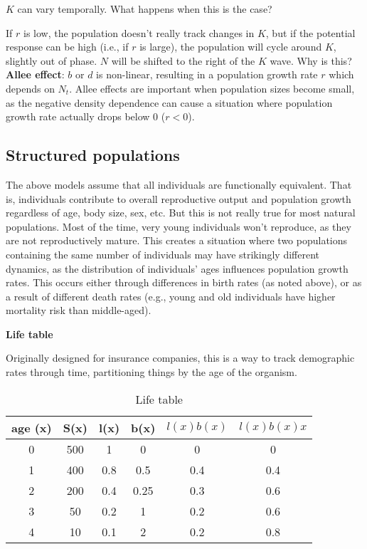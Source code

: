 \documentclass[12pt]{article}
\begin{document}
\bigskip

$K$ can vary temporally. What happens when this is the case? 

If $r$ is low, the population doesn't really track changes in $K$, but if the potential response can be high (i.e., if $r$ is large), the population will cycle around $K$, slightly out of phase. $N$ will be shifted to the right of the $K$ wave. Why is this? \\





\textbf{Allee effect}: $b$ or $d$ is non-linear, resulting in a population growth rate $r$ which depends on $N_{t}$. Allee effects are important when population sizes become small, as the negative density dependence can cause a situation where population growth rate actually drops below 0 ($r < 0$). 





\clearpage



\subsection*{Structured populations}

The above models assume that all individuals are functionally equivalent. That is, individuals contribute to overall reproductive output and population growth regardless of age, body size, sex, etc. But this is not really true for most natural populations. Most of the time, very young individuals won't reproduce, as they are not reproductively mature. This creates a situation where two populations containing the same number of individuals may have strikingly different dynamics, as the distribution of individuals' ages influences population growth rates. This occurs either through differences in birth rates (as noted above), or as a result of different death rates (e.g., young and old individuals have higher mortality risk than middle-aged).


\textbf{Life table}

Originally designed for insurance companies, this is a way to track demographic rates through time, partitioning things by the age of the organism. 



\begin{table}[h!]
\centering
\caption{Life table}
\vspace{0.5cm}
\begin{tabular}{cccccc}
\hline
age (x) & S(x) & l(x) & b(x) & $l(x)b(x)$ & $l(x)b(x)x$ \\
\hline
0 & 500 & 1   & 0  & 0 & 0   \\
1 & 400 & 0.8 & 0.5  & 0.4 & 0.4 \\
2 & 200 & 0.4 & 0.25 & 0.3 & 0.6 \\
3 & 50  & 0.2 & 1  & 0.2  &  0.6 \\
4 & 10  & 0.1 & 2 & 0.2  &  0.8 \\
\hline
\end{tabular}
\end{table}
\end{document}

